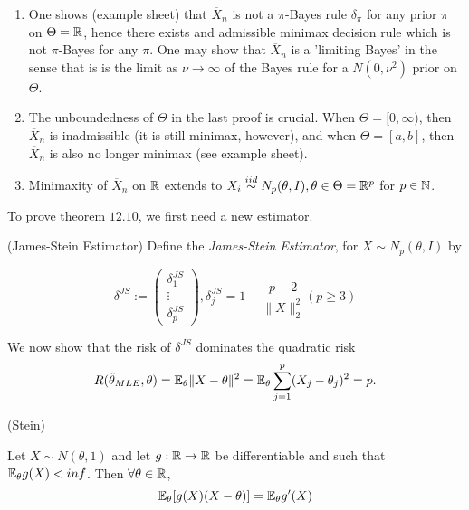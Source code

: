 \documentclass[a4paper]{article}
\begin{document}
\begin{remark}
	\begin{enumerate}[label=\roman*)]
		\item One shows (example sheet) that $\overline{X}_n$ is not a $\pi$-Bayes rule $\delta_{\pi}$ for any prior $\pi$ on $\Theta = \mathbb{R}$, hence there exists and admissible minimax decision rule which is not $\pi$-Bayes for any $\pi$. One may show that $\overline{X}_n$ is a 'limiting Bayes' in the sense that is is the limit as $\nu \to \infty$ of the Bayes rule for a $N(0, \nu^2)$ prior on $\Theta$.
		\item The unboundedness of $\Theta$ in the last proof is crucial. When  $\Theta = [0,\infty)$, then $\overline{X}_n$ is inadmissible (it is still minimax, however), and when $\Theta = [a,b]$, then $\overline{X}_n$ is also no longer minimax (see example sheet).
		\item Minimaxity of $\overline{X}_n$ on $\mathbb{R}$ extends to $X_i \stackrel{iid}{\sim} N_p(\theta, I), \theta\in \Theta = \mathbb{R}^{p}$ for $p \in \mathbb{N}$.
		
	\end{enumerate}
\end{remark}

To prove theorem $12.10$, we first need a new estimator.

\begin{defn} (James-Stein Estimator)
	Define the \textit{James-Stein Estimator}, for $X \sim N_p(\theta, I)$ by

	 \[
		 \delta^{JS} := \begin{pmatrix} \delta_1^{JS} \\ \vdots \\ \delta_p^{JS} \end{pmatrix}, \delta_j^{JS} = 1 - \frac{p-2}{\|X\|_2^2} (p\ge 3)
	\] 
\end{defn}

We now show that the risk of $\delta^{JS}$ dominates the quadratic risk
\[
	R(\hat{\theta}_{MLE}, \theta) = \mathbb{E}_{\theta} \|X - \theta\|^2 = \mathbb{E}_{\theta} \sum_{j=1}^{p}(X_j - \theta_j)^2 = p
.\] 

\begin{lemma} (Stein)

	Let $X \sim N(\theta, 1)$ and let $g: \mathbb{R} \to \mathbb{R}$ be differentiable and such that $\mathbb{E}_{\theta} g(X) < inf$. Then $\forall \theta \in \mathbb{R}$,
	\[
		\mathbb{E}_{\theta} [g(X)(X-\theta)] = \mathbb{E}_{\theta} g'(X)
	\] 
	
\end{lemma}
\end{document}

